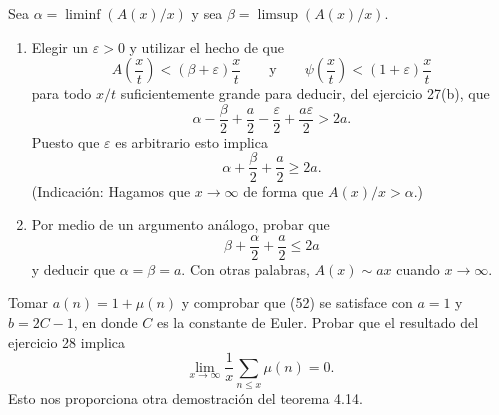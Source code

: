 \documentclass[12pt,a4paper]{book}
\begin{document}
    \begin{ejercicio}
        Sea $\alpha=\liminf(A(x)/x)$ y sea $\beta=\limsup(A(x)/x)$.
        \begin{enumerate}
            \item[(a)] Elegir un $\varepsilon>0$ y utilizar el hecho de que
            \begin{equation*}
                A\left(\frac{x}{t}\right)<(\beta+\varepsilon)\frac{x}{t}\qquad\text{y}\qquad
                \psi\left(\frac{x}{t}\right)<(1+\varepsilon)\frac{x}{t}
            \end{equation*}
            para todo $x/t$ suficientemente grande para deducir, del ejercicio
            27(b), que
            \begin{equation*}
                \alpha-\frac{\beta}{2}+\frac{a}{2}-\frac{\varepsilon}{2}+\frac{a\varepsilon}{2}>2a.
            \end{equation*}
            Puesto que $\varepsilon$ es arbitrario esto implica
            \begin{equation*}
                \alpha+\frac{\beta}{2}+\frac{a}{2}\geq2a.
            \end{equation*}
            (Indicación: Hagamos que $x\to\infty$ de forma que $A(x)/x>\alpha$.)
            \item[(b)] Por medio de un argumento análogo, probar que
            \begin{equation*}
                \beta+\frac{\alpha}{2}+\frac{a}{2}\leq2a
            \end{equation*}
            y deducir que $\alpha=\beta=a$. Con otras palabras, $A(x)\sim ax$ cuando
            $x\to\infty$.
        \end{enumerate}
    \end{ejercicio}

    \begin{ejercicio}
        Tomar $a(n)=1+\mu(n)$ y comprobar que (52) se satisface con $a=1$ y
        $b=2C-1$, en donde $C$ es la constante de Euler. Probar que el resultado del
        ejercicio 28 implica
        \begin{equation*}
            \lim_{x\to\infty}\frac{1}{x}\sum_{n\leq x}\mu(n)=0.
        \end{equation*}
        Esto nos proporciona otra demostración del teorema 4.14.
    \end{ejercicio}
\end{document}
